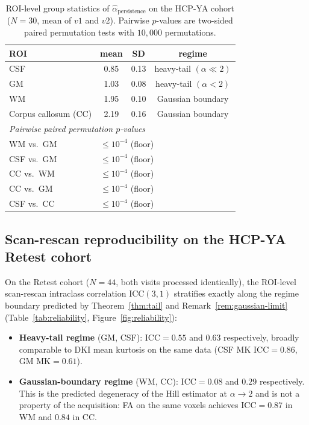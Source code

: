 \documentclass[11pt,letterpaper]{article}
\newcommand{\stab}{\alpha}
\begin{document}
\begin{table}[t]
\centering
\caption{ROI-level group statistics of
$\widehat{\stab}_{\mathrm{persistence}}$ on the HCP-YA cohort
($N=30$, mean of $v1$ and $v2$). Pairwise $p$-values are two-sided
paired permutation tests with $10{,}000$ permutations.}
\label{tab:roi}
\small
\begin{tabular}{lccc}
\toprule
ROI                          & mean & SD   & regime \\ \midrule
CSF                          & 0.85 & 0.13 & heavy-tail $(\stab\!\ll\!2)$ \\
GM                           & 1.03 & 0.08 & heavy-tail $(\stab\!<\!2)$ \\
WM                           & 1.95 & 0.10 & Gaussian boundary \\
Corpus callosum (CC)         & 2.19 & 0.16 & Gaussian boundary \\ \midrule
\multicolumn{4}{l}{\textit{Pairwise paired permutation $p$-values}} \\
WM vs.\ GM                   & \multicolumn{3}{l}{$\le 10^{-4}$ (floor)} \\
CSF vs.\ GM                  & \multicolumn{3}{l}{$\le 10^{-4}$ (floor)} \\
CC vs.\ WM                   & \multicolumn{3}{l}{$\le 10^{-4}$ (floor)} \\
CC vs.\ GM                   & \multicolumn{3}{l}{$\le 10^{-4}$ (floor)} \\
CSF vs.\ CC                  & \multicolumn{3}{l}{$\le 10^{-4}$ (floor)} \\ \bottomrule
\end{tabular}
\end{table}

\subsection{Scan-rescan reproducibility on the HCP-YA Retest cohort}
On the Retest cohort ($N=44$, both visits processed identically), the
ROI-level scan-rescan intraclass correlation ICC$(3,1)$ stratifies
exactly along the regime boundary predicted by
Theorem~\ref{thm:tail} and Remark~\ref{rem:gaussian-limit}
(Table~\ref{tab:reliability}, Figure~\ref{fig:reliability}):

\begin{itemize}
\item \textbf{Heavy-tail regime} (GM, CSF): ICC$=0.55$ and $0.63$
  respectively, broadly comparable to DKI mean kurtosis on the same
  data (CSF MK ICC$=0.86$, GM MK$=0.61$).
\item \textbf{Gaussian-boundary regime} (WM, CC): ICC$=0.08$ and
  $0.29$ respectively. This is the predicted degeneracy of the Hill
  estimator at $\stab\to 2$ and is not a property of the
  acquisition: FA on the same voxels achieves ICC$=0.87$ in WM and
  $0.84$ in CC.
\end{itemize}
\end{document}
